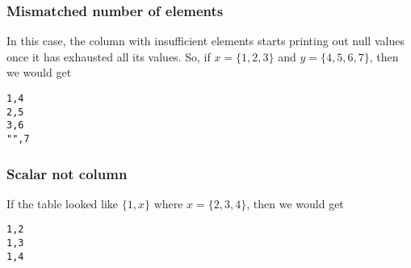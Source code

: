 \documentclass[letterpaper]{article}
\begin{document}
\subsubsection{Mismatched number of elements}
In this case, the column with insufficient elements starts printing out null
values once it has exhausted all its values. So, if \(x = \{1, 2,3\}\) and \(y
= \{4, 5, 6, 7\}\), then we would get
\begin{verbatim}
1,4
2,5
3,6
"",7
\end{verbatim}

\subsubsection{Scalar not column}
If the table looked like \(\{1, x\}\) where \(x = \{2, 3, 4 \}\), then we would
get
\begin{verbatim}
1,2
1,3
1,4
\end{verbatim}
\end{document}
